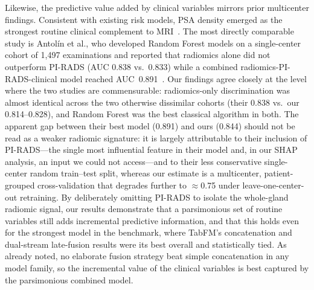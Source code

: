 \documentclass[11pt]{article}
\begin{document}
Likewise, the predictive value added by clinical variables mirrors prior multicenter findings.
Consistent with existing risk models, PSA density emerged as the strongest routine clinical
complement to MRI~\citep{RadiomicsMultisite2023,RadiomicsNomogram2022}. The most directly
comparable study is Antol{\'i}n et al., who developed Random Forest models on a single-center
cohort of 1{,}497 examinations and reported that radiomics alone did not outperform PI-RADS
(AUC 0.838 vs.\ 0.833) while a combined radiomics-PI-RADS-clinical model reached
AUC~0.891~\citep{Antolin2026Insights}. Our findings agree closely at the level where the two
studies are commensurable: radiomics-only discrimination was almost identical across the two
otherwise dissimilar cohorts (their 0.838 vs.\ our 0.814--0.828), and Random Forest was the best
classical algorithm in both. The apparent gap between their best model (0.891) and ours (0.844)
should not be read as a weaker radiomic signature: it is largely attributable to their inclusion
of PI-RADS---the single most influential feature in their model and, in our SHAP analysis, an
input we could not access---and to their less conservative single-center random train--test split,
whereas our estimate is a multicenter, patient-grouped cross-validation that degrades further to
$\approx$0.75 under leave-one-center-out retraining. By deliberately omitting PI-RADS to isolate
the whole-gland radiomic signal, our results
demonstrate that a parsimonious set of routine variables still adds incremental
predictive information, and that this holds even for the strongest model in the
benchmark, where TabFM's concatenation and dual-stream late-fusion results were
its best overall and statistically tied. As already noted, no elaborate fusion
strategy beat simple concatenation in any model family, so the incremental value
of the clinical variables is best captured by the parsimonious combined model.
\end{document}
